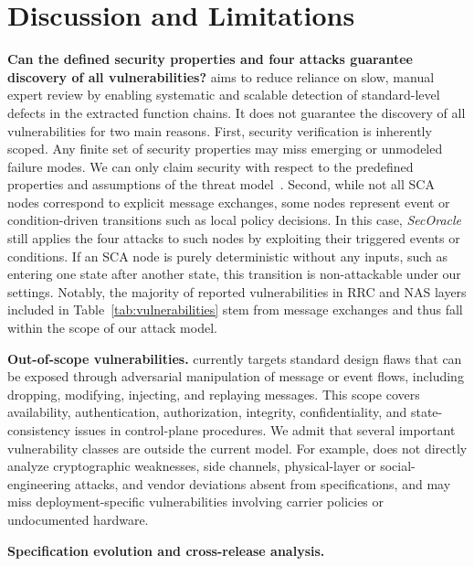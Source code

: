 
\vspace{-0.08in}
\section{Discussion and Limitations}
\label{append:discussion}

\noindent \textbf{Can the defined security properties and four attacks guarantee discovery of all vulnerabilities?} 
\lm aims to reduce reliance on slow, manual expert review by enabling systematic and scalable detection of standard-level defects in the extracted function chains. It does not guarantee the discovery of all vulnerabilities for two main reasons.
First, security verification is inherently scoped. Any finite set of security properties may miss emerging or unmodeled failure modes. We can only claim security with respect to the predefined properties and assumptions of the threat model~\cite{chen2023sherlock,al2024hermes}. Second, while not all SCA nodes correspond to explicit message exchanges, some nodes represent event or condition-driven transitions such as local policy decisions. In this case, \textit{SecOracle} still applies the four attacks to such nodes by exploiting their triggered events or conditions. If an SCA node is purely deterministic without any inputs, such as entering one state after another state, this transition is non-attackable under our settings. Notably, the majority of reported vulnerabilities in RRC and NAS layers included in Table~\ref{tab:vulnerabilities} stem from message exchanges and thus fall within the scope of our attack model.   

\noindent  \textbf{Out-of-scope vulnerabilities.}
\lm currently targets standard design flaws that can be exposed through adversarial manipulation of message or event flows, including dropping, modifying, injecting, and replaying messages. This scope covers availability, authentication, authorization, integrity, confidentiality, and state-consistency issues in control-plane procedures. We admit that several important vulnerability classes are outside the current model. For example, \lm does not directly analyze cryptographic weaknesses, side channels, physical-layer or social-engineering attacks, and vendor deviations absent from specifications, and may miss deployment-specific vulnerabilities involving carrier policies or undocumented hardware.





\noindent\textbf{Specification evolution and cross-release analysis.} 

